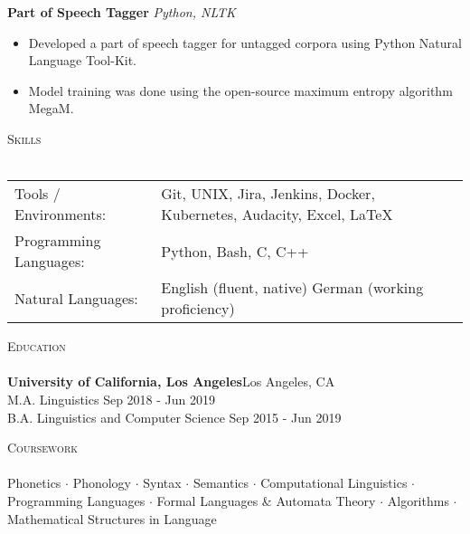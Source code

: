 \documentclass[]{article}
\newcommand{\lineunder} {
    \vspace*{-8pt} \\
    \hspace*{-18pt} \hrulefill \\
}
\newcommand{\header} [1] {
    {\hspace*{-18pt}\vspace*{6pt} \textsc{#1}}
    \vspace*{-6pt} \lineunder
}
\begin{document}
{\textbf{Part of Speech Tagger}} \hspace*{5mm} {\sl Python, NLTK} \\
\vspace*{-5pt}\begin{itemize}	\itemsep 0pt
	\item Developed a part of speech tagger for untagged corpora using Python Natural Language Tool-Kit.
	\item Model training was done using the open-source maximum entropy algorithm MegaM.
\end{itemize}
\vspace*{0mm}

\header{Skills}
\begin{tabular}{ l p{11.2cm} }
	Tools / Environments:  & Git, UNIX, Jira, Jenkins, Docker, Kubernetes, Audacity, Excel, \LaTeX
	\\
	Programming Languages: & Python, Bash, C, C++
	\\
	Natural Languages:     & English \hfill (fluent, native) \newline German \hfill (working proficiency)
	\\
\end{tabular}
\vspace{2mm}


\header{Education}
\textbf{University of California, Los Angeles}\hfill Los Angeles, CA\\
M.A. Linguistics \hfill Sep 2018 - Jun 2019\\
\vspace{1mm}
B.A. Linguistics and Computer Science \hfill Sep 2015 - Jun 2019\\
\vspace{1mm}
\vspace{1mm}

\header{Coursework}
Phonetics $\cdot$ Phonology $\cdot$ Syntax $\cdot$ Semantics $\cdot$ Computational Linguistics $\cdot$ Programming Languages $\cdot$ Formal Languages \& Automata Theory $\cdot$ Algorithms $\cdot$ Mathematical Structures in Language
\vspace*{10mm}
\end{document}
